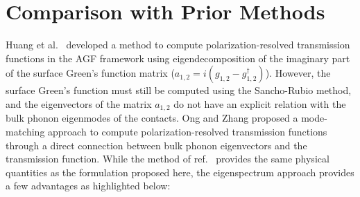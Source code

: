 \documentclass[11pt]{article}
\begin{document}
\section{Comparison with Prior Methods}
\label{comparison_prior}
Huang et al.~\cite{huang2011modeling} developed a method to compute polarization-resolved transmission functions in the AGF framework using eigendecomposition of the imaginary part of the surface Green's function matrix ($a_{1,2} = i(g_{1,2}-g_{1,2}^{\dagger})$). However, the surface Green's function must still be computed using the Sancho-Rubio method, and the eigenvectors of the matrix $a_{1,2}$ do not have an explicit relation with the bulk phonon eigenmodes of the contacts. Ong and Zhang \cite{ong2015efficient} proposed a mode-matching approach to compute polarization-resolved transmission functions through a direct connection between bulk phonon eigenvectors and the transmission function. While the method of ref.~\cite{ong2015efficient} provides the same physical quantities as the formulation proposed here, the eigenspectrum approach provides a few advantages as highlighted below:
\end{document}
